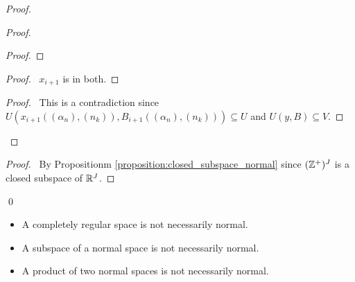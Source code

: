 \begin{proof}
\begin{proof}
        \begin{proof}
        \end{proof}
        \begin{proof}
            \pf\ $x_{i+1}$ is in both.
        \end{proof}
        \qedstep
        \begin{proof}
            \pf\ This is a contradiction since
            $U(x_{i+1}((\alpha_n),(n_k)),B_{i+1}((\alpha_n),(n_k))) \subseteq U$ and
            $U(y,B) \subseteq V$.
        \end{proof}
    \end{proof}
    \qedstep
    \begin{proof}
        \pf\ By Propositionm \ref{proposition:closed_subspace_normal}
        since $(\mathbb{Z}^+)^J$ is a closed subspace of $\mathbb{R}^J$.
    \end{proof}
    \qed
\end{proof}

\begin{itemize}
    \item A completely regular space is not necessarily normal.
    \item A subspace of a normal space is not necessarily normal.
    \item A product of two normal spaces is not necessarily normal.
\end{itemize}

